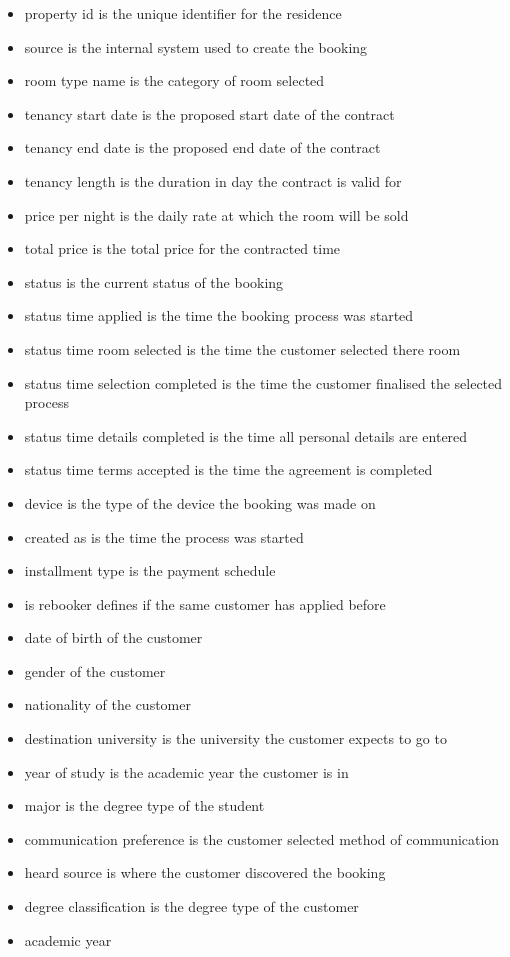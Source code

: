 \begin{itemize}
    \item property id is the unique identifier for the residence 
    \item source is the internal system used to create the booking
    \item room type name is the category of room selected
    \item tenancy start date is the proposed start date of the contract
    \item tenancy end date is the proposed end date of the contract
    \item tenancy length is the duration in day the contract is valid for
    \item price per night is the daily rate at which the room will be sold
    \item total price is the total price for the contracted time
    \item status is the current status of the booking
    \item status time applied is the time the booking process was started
    \item status time room selected is the time the customer selected there room
    \item status time selection completed is the time the customer finalised the selected process 
    \item status time details completed is the time all personal details are entered
    \item status time terms accepted is the time the agreement is completed
    \item device is the type of the device the booking was made on
    \item created as is the time the process was started
    \item installment type is the payment schedule
    \item is rebooker defines if the same customer has applied before
    \item date of birth of the customer
    \item gender of the customer
    \item nationality of the customer
    \item destination university is the university the customer expects to go to
    \item year of study is the academic year  the customer is in
    \item major is the degree type of the student
    \item communication preference is the customer selected method of communication
    \item heard source is where the customer discovered the booking
    \item degree classification is the degree type of the customer
    \item academic year
\end{itemize}

